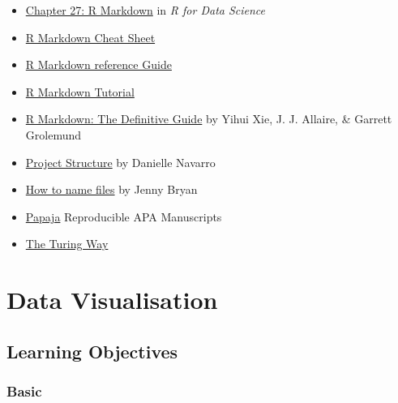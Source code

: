 \documentclass[
  oneside]{book}
\providecommand{\tightlist}{%
  \setlength{\itemsep}{0pt}\setlength{\parskip}{0pt}}
\begin{document}
\begin{itemize}
\tightlist
\item
  \href{http://r4ds.had.co.nz/r-markdown.html}{Chapter 27: R Markdown} in \emph{R for Data Science}
\item
  \href{https://github.com/rstudio/cheatsheets/raw/master/rmarkdown.pdf}{R Markdown Cheat Sheet}
\item
  \href{https://www.rstudio.com/wp-content/uploads/2015/03/rmarkdown-reference.pdf}{R Markdown reference Guide}
\item
  \href{https://rmarkdown.rstudio.com/lesson-1.html}{R Markdown Tutorial}
\item
  \href{https://bookdown.org/yihui/rmarkdown/}{R Markdown: The Definitive Guide} by Yihui Xie, J. J. Allaire, \& Garrett Grolemund
\item
  \href{https://slides.djnavarro.net/project-structure/}{Project Structure} by Danielle Navarro
\item
  \href{https://speakerdeck.com/jennybc/how-to-name-files}{How to name files} by Jenny Bryan
\item
  \href{https://crsh.github.io/papaja_man/}{Papaja} Reproducible APA Manuscripts
\item
  \href{https://the-turing-way.netlify.app/}{The Turing Way}
\end{itemize}

\hypertarget{ggplot}{%
\chapter{Data Visualisation}\label{ggplot}}

\hypertarget{ilo-ggplot}{%
\section{Learning Objectives}\label{ilo-ggplot}}

\hypertarget{basic-1}{%
\subsection*{Basic}\label{basic-1}}
\end{document}
